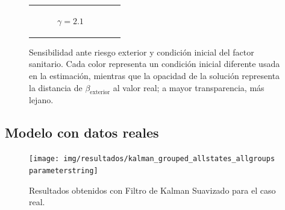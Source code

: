 \begin{figure}
\begin{tabular}{c c}
\begin{subfigure}[b]{0.75\textwidth}
     \caption{\(\gamma = 2.1\)}
\end{subfigure} & \\
\end{tabular}
\caption[Sensibilidad ante riesgo exterior y condición inicial del factor sanitario.]{Sensibilidad ante riesgo exterior y condición inicial del factor sanitario. Cada color representa un condición inicial diferente usada en la estimación, mientras que la opacidad de la solución representa la distancia de \(\beta_{\text{exterior}}\) al valor real; a mayor transparencia, más lejano.} \label{fig:legend-sensi-b}
\end{figure}




\subsection{Modelo con datos reales}


\begin{figure}[h]
\centering
\texttt{[image: img/resultados/kalman\_grouped\_allstates\_allgroups\\parameterstring]}
\caption{Resultados obtenidos con Filtro de Kalman Suavizado para el caso real.}
\label{all-nohigh}
\end{figure}



